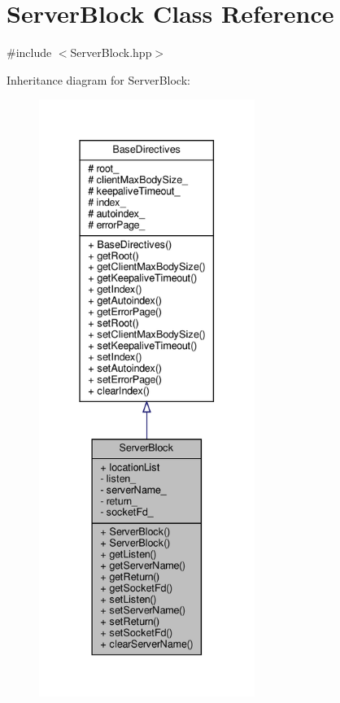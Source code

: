 \hypertarget{classft_1_1_server_block}{}\section{Server\+Block Class Reference}
\label{classft_1_1_server_block}


{\ttfamily \#include $<$Server\+Block.\+hpp$>$}



Inheritance diagram for Server\+Block\+:
\nopagebreak
\begin{figure}[H]
\begin{center}
\leavevmode
\includegraphics[height=550pt]{classft_1_1_server_block__inherit__graph}
\end{center}
\end{figure}


